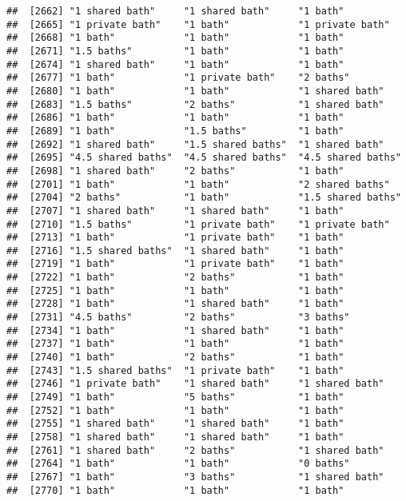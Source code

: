 \documentclass[
]{article}
\begin{document}
\begin{verbatim}
##  [2662] "1 shared bath"     "1 shared bath"     "1 bath"           
##  [2665] "1 private bath"    "1 bath"            "1 private bath"   
##  [2668] "1 bath"            "1 bath"            "1 bath"           
##  [2671] "1.5 baths"         "1 bath"            "1 bath"           
##  [2674] "1 shared bath"     "1 bath"            "1 bath"           
##  [2677] "1 bath"            "1 private bath"    "2 baths"          
##  [2680] "1 bath"            "1 bath"            "1 shared bath"    
##  [2683] "1.5 baths"         "2 baths"           "1 shared bath"    
##  [2686] "1 bath"            "1 bath"            "1 bath"           
##  [2689] "1 bath"            "1.5 baths"         "1 bath"           
##  [2692] "1 shared bath"     "1.5 shared baths"  "1 shared bath"    
##  [2695] "4.5 shared baths"  "4.5 shared baths"  "4.5 shared baths" 
##  [2698] "1 shared bath"     "2 baths"           "1 bath"           
##  [2701] "1 bath"            "1 bath"            "2 shared baths"   
##  [2704] "2 baths"           "1 bath"            "1.5 shared baths" 
##  [2707] "1 shared bath"     "1 shared bath"     "1 bath"           
##  [2710] "1.5 baths"         "1 private bath"    "1 private bath"   
##  [2713] "1 bath"            "1 private bath"    "1 bath"           
##  [2716] "1.5 shared baths"  "1 shared bath"     "1 bath"           
##  [2719] "1 bath"            "1 private bath"    "1 bath"           
##  [2722] "1 bath"            "2 baths"           "1 bath"           
##  [2725] "1 bath"            "1 bath"            "1 bath"           
##  [2728] "1 bath"            "1 shared bath"     "1 bath"           
##  [2731] "4.5 baths"         "2 baths"           "3 baths"          
##  [2734] "1 bath"            "1 shared bath"     "1 bath"           
##  [2737] "1 bath"            "1 bath"            "1 bath"           
##  [2740] "1 bath"            "2 baths"           "1 bath"           
##  [2743] "1.5 shared baths"  "1 private bath"    "1 bath"           
##  [2746] "1 private bath"    "1 shared bath"     "1 shared bath"    
##  [2749] "1 bath"            "5 baths"           "1 bath"           
##  [2752] "1 bath"            "1 bath"            "1 bath"           
##  [2755] "1 shared bath"     "1 shared bath"     "1 bath"           
##  [2758] "1 shared bath"     "1 shared bath"     "1 bath"           
##  [2761] "1 shared bath"     "2 baths"           "1 shared bath"    
##  [2764] "1 bath"            "1 bath"            "0 baths"          
##  [2767] "1 bath"            "3 baths"           "1 shared bath"    
##  [2770] "1 bath"            "1 bath"            "1 bath"           

\end{verbatim}
\end{document}
